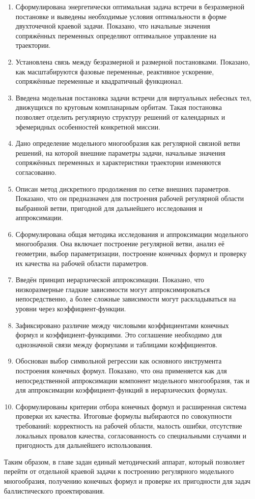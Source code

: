 \begin{enumerate}
	\item Сформулирована энергетически оптимальная задача встречи в безразмерной постановке и выведены необходимые условия оптимальности в форме двухточечной краевой задачи. Показано, что начальные значения сопряжённых переменных определяют оптимальное управление на траектории.
	
	\item Установлена связь между безразмерной и размерной постановками. Показано, как масштабируются фазовые переменные, реактивное ускорение, сопряжённые переменные и квадратичный функционал.
	
	\item Введена модельная постановка задачи встречи для виртуальных небесных тел, движущихся по круговым компланарным орбитам. Такая постановка позволяет отделить регулярную структуру решений от календарных и эфемеридных особенностей конкретной миссии.
	
	\item Дано определение модельного многообразия как регулярной связной ветви решений, на которой внешние параметры задачи, начальные значения сопряжённых переменных и характеристики траектории изменяются согласованно.
	
	\item Описан метод дискретного продолжения по сетке внешних параметров. Показано, что он предназначен для построения рабочей регулярной области выбранной ветви, пригодной для дальнейшего исследования и аппроксимации.
	
	\item Сформулирована общая методика исследования и аппроксимации модельного многообразия. Она включает построение регулярной ветви, анализ её геометрии, выбор параметризации, построение конечных формул и проверку их качества на рабочей области параметров.
	
	\item Введён принцип иерархической аппроксимации. Показано, что низкоразмерные гладкие зависимости могут аппроксимироваться непосредственно, а более сложные зависимости могут раскладываться на уровни через коэффициент-функции.
	
	\item Зафиксировано различие между числовыми коэффициентами конечных формул и коэффициент-функциями. Это соглашение необходимо для однозначной связи между формулами и таблицами коэффициентов.
	
	\item Обоснован выбор символьной регрессии как основного инструмента построения конечных формул. Показано, что она применяется как для непосредственной аппроксимации компонент модельного многообразия, так и для аппроксимации коэффициент-функций в иерархических формулах.
	
	\item Сформулированы критерии отбора конечных формул и расширенная система проверки их качества. Итоговые формулы выбираются по совокупности требований: корректность на рабочей области, малость ошибки, отсутствие локальных провалов качества, согласованность со специальными случаями и пригодность для дальнейшего использования.
\end{enumerate}

Таким образом, в главе задан единый методический аппарат, который позволяет перейти от отдельной краевой задачи к построению регулярного модельного многообразия, получению конечных формул и проверке их пригодности для задач баллистического проектирования.
